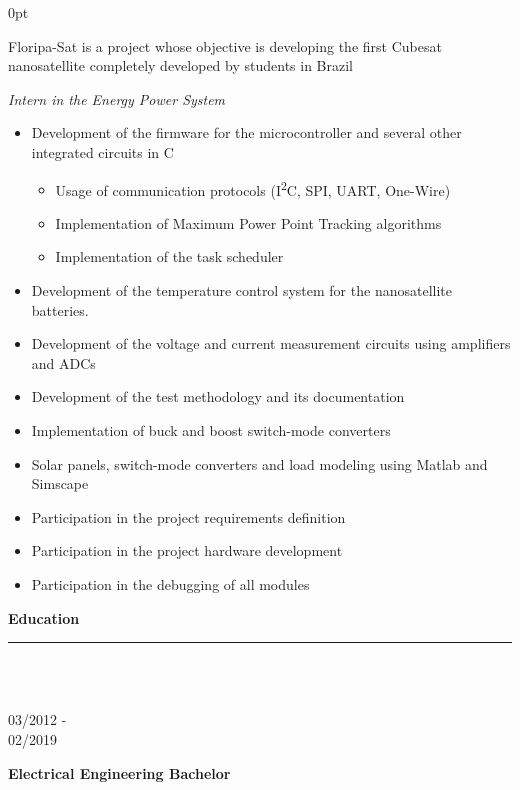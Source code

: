 \documentclass[a4paper]{article}
\begin{document}
\begin{adjustwidth}{\parindent}{0pt}
\begin{minipage}[t]{0.65\textwidth}
\begin{minipage}[t]{0.8\textwidth}
{  \large{Floripa-Sat is a project whose objective is developing the first Cubesat nanosatellite completely developed by students in Brazil}
  
  \large{\textit{Intern in the Energy Power System}}
}
\begin{itemize}
  \item \normalsize{Development of the firmware for the microcontroller and several other integrated circuits in C}
  \begin{itemize}
    \item Usage of communication protocols (I\textsuperscript{2}C, SPI, UART, One-Wire)
    \item Implementation of Maximum Power Point Tracking algorithms
    \item Implementation of the task scheduler
  \end{itemize}
  \item Development of the temperature control system for the nanosatellite batteries.
  \item Development of the voltage and current measurement circuits using amplifiers and ADCs
  \item Development of the test methodology and its documentation
  \item Implementation of buck and boost switch-mode converters
  \item Solar panels, switch-mode converters and load modeling using Matlab and Simscape
  \item Participation in the project requirements definition
  \item Participation in the project hardware development
  \item Participation in the debugging of all modules \\
\end{itemize}
  
\end{minipage}

\Large{\textbf{Education}} \normalsize \\ \rule{\textwidth}{0.5pt} \\ \\
\begin{minipage}[t]{0.2\textwidth}
\large{03/2012 - \\ 02/2019}
\end{minipage}
\begin{minipage}[t]{0.8\textwidth}
{
  \setlength{\parskip}{5.5pt}
  \Large{\textbf{Electrical Engineering Bachelor}}
  
}
\end{minipage}
\end{minipage}
\end{adjustwidth}
\end{document}
